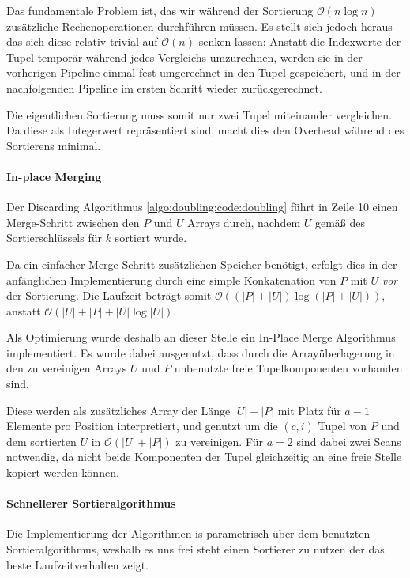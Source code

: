 Das fundamentale Problem ist, das wir während der Sortierung $\mathcal{O}(n \log n)$ zusätzliche Rechenoperationen durchführen müssen. Es stellt sich jedoch heraus das sich diese relativ trivial auf $\mathcal{O}(n)$ senken lassen: Anstatt die Indexwerte der Tupel temporär während jedes Vergleichs umzurechnen, werden sie in der vorherigen Pipeline einmal fest umgerechnet in den Tupel gespeichert, und in der nachfolgenden Pipeline im ersten Schritt wieder zurückgerechnet.

Die eigentlichen Sortierung muss somit nur zwei Tupel miteinander vergleichen. Da diese als Integerwert repräsentiert sind, macht dies den Overhead während des Sortierens minimal.

\paragraph{In-place Merging}

Der Discarding Algorithmus \ref{algo:doubling:code:doubling} führt in Zeile 10 einen Merge-Schritt zwischen den $P$ und $U$ Arrays durch, nachdem $U$ gemäß des Sortierschlüssels für $k$ sortiert wurde. 

Da ein einfacher Merge-Schritt zusätzlichen Speicher benötigt, erfolgt dies in der anfänglichen Implementierung durch eine simple Konkatenation von $P$ mit $U$ \textit{vor} der Sortierung. Die Laufzeit beträgt somit $\mathcal{O}( (|P| + |U|) \log (|P| + |U|))$, anstatt $\mathcal{O}( |U| + |P| + |U| \log |U|)$.

Als Optimierung wurde deshalb an dieser Stelle ein In-Place Merge Algorithmus implementiert. Es wurde dabei ausgenutzt, dass durch die Arrayüberlagerung in den zu vereinigen Arrays $U$ und $P$ unbenutzte freie Tupelkomponenten vorhanden sind.

Diese werden als zusätzliches Array der Länge $|U| + |P|$ mit Platz für $a - 1$ Elemente pro Position interpretiert, und genutzt um die $(c, i)$ Tupel von $P$ und dem sortierten $U$ in $\mathcal{O}( |U| + |P|)$ zu vereinigen. Für $a=2$ sind dabei zwei Scans notwendig, da nicht beide Komponenten der Tupel gleichzeitig an eine freie Stelle kopiert werden können.

\paragraph{Schnellerer Sortieralgorithmus}

Die Implementierung der Algorithmen is parametrisch über dem benutzten Sortieralgorithmus, weshalb es uns frei steht einen Sortierer zu nutzen der das beste Laufzeitverhalten zeigt.

